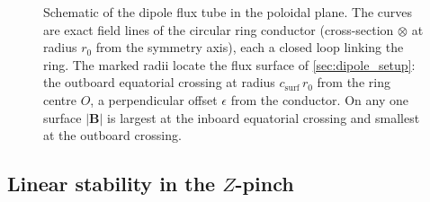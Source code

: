 \documentclass{jpp}
\newcommand{\bB}{\mathbf{B}}
\begin{document}
\begin{figure}
\caption{Schematic of the dipole flux tube in the poloidal plane. The curves are exact field lines of the circular ring conductor (cross-section $\otimes$ at radius $r_0$ from the symmetry axis), each a closed loop linking the ring. The marked radii locate the flux surface of \cref{sec:dipole_setup}: the outboard equatorial crossing at radius $c_\mathrm{surf}\,r_0$ from the ring centre $O$, a perpendicular offset $\epsilon$ from the conductor. On any one surface $|\bB|$ is largest at the inboard equatorial crossing and smallest at the outboard crossing.}
\label{fig:dipole_geom_schematic}
\end{figure}

\subsection{Linear stability in the $Z$-pinch}\label{sec:linear}\label{sec:growth_rate}
\end{document}
